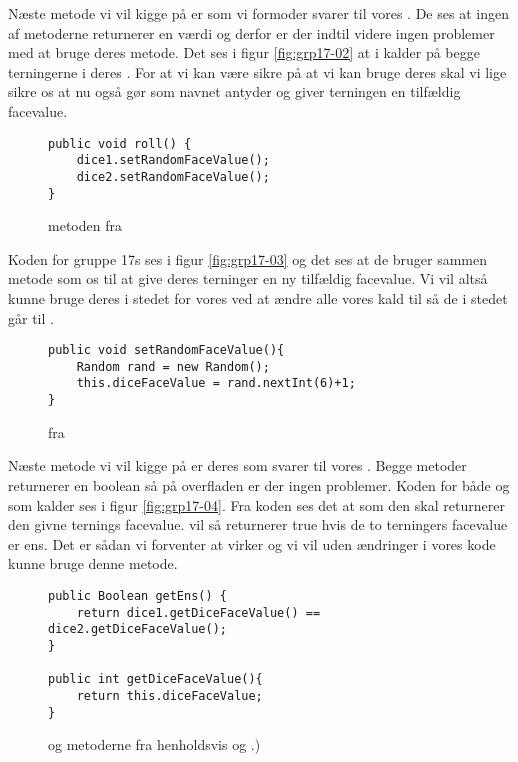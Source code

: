 Næste metode vi vil kigge på er  som vi formoder svarer til vores . De ses at ingen af metoderne returnerer en værdi og derfor er der indtil videre ingen problemer med at bruge deres metode. Det ses i figur \vref{fig:grp17-02} at  i  kalder  på begge terningerne i deres . For at vi kan være sikre på at vi kan bruge deres  skal vi lige sikre os at  nu også gør som navnet antyder og giver terningen en tilfældig facevalue.
\begin{figure}
\caption{ metoden fra \cite{grp17}}\label{fig:grp17-02}
\centering
\begin{verbatim}
public void roll() {
    dice1.setRandomFaceValue();
    dice2.setRandomFaceValue();
}
\end{verbatim}
\end{figure}

Koden for gruppe 17s  ses i figur \vref{fig:grp17-03} og det ses at de bruger sammen metode som os til at give deres terninger en ny tilfældig facevalue. Vi vil altså kunne bruge deres  i stedet for vores  ved at ændre alle vores kald til  så de i stedet går til .
\begin{figure}
\centering
\caption{ fra \cite{grp17}}\label{fig:grp17-03}
\begin{verbatim}
public void setRandomFaceValue(){
    Random rand = new Random();
    this.diceFaceValue = rand.nextInt(6)+1;
}
\end{verbatim}
\end{figure}

Næste metode vi vil kigge på er deres  som svarer til vores . Begge metoder returnerer en boolean så på overfladen er der ingen problemer. Koden for både  og  som  kalder ses i figur \vref{fig:grp17-04}. Fra koden ses det at  som den skal returnerer den givne ternings facevalue.  vil så returnerer true hvis de to terningers facevalue er ens. Det er sådan vi forventer at  virker og vi vil uden ændringer i vores kode kunne bruge denne metode.
\begin{figure}
\centering
\caption{ og  metoderne fra henholdsvis  og .)\cite{grp17}}\label{fig:grp17-04}
\begin{verbatim}
public Boolean getEns() {
    return dice1.getDiceFaceValue() == dice2.getDiceFaceValue();
}

public int getDiceFaceValue(){
    return this.diceFaceValue;
}
\end{verbatim}
\end{figure}

